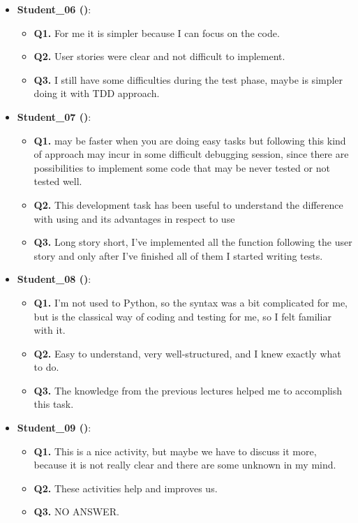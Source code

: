 \begin{itemize}
    \item \textbf{Student\_06 (\notdd)}: 
    \begin{itemize}
        \item \textbf{Q1.} For me it is simpler because I can focus on the code.
        \item \textbf{Q2.} User stories were clear and not difficult to implement.
        \item \textbf{Q3.} I still have some difficulties during the test phase, maybe is simpler doing it with TDD approach.
    \end{itemize}

    \item \textbf{Student\_07 (\notdd)}: 
    \begin{itemize}
        \item \textbf{Q1.} \notdd may be faster when you are doing easy tasks but following this kind of approach may incur in some difficult debugging session, since there are possibilities to implement some code that may be never tested or not tested well.
        \item \textbf{Q2.} This development task has been useful to understand the difference with using \tdd and its advantages in respect to use \notdd
        \item \textbf{Q3.} Long story short, I've implemented all the function following the user story and only after I've finished all of them I started writing tests.
    \end{itemize}

    \item \textbf{Student\_08 (\notdd)}: 
    \begin{itemize}
        \item \textbf{Q1.} I'm not used to Python, so the syntax was a bit complicated for me, but \notdd is the classical way of coding and testing for me, so I felt familiar with it.
        \item \textbf{Q2.} Easy to understand, very well-structured, and I knew exactly what to do.
        \item \textbf{Q3.} The knowledge from the previous lectures helped me to accomplish this task.
    \end{itemize}

    \item \textbf{Student\_09 (\notdd)}: 
    \begin{itemize}
        \item \textbf{Q1.} This is a nice activity, but maybe we have to discuss it more, because it is not really clear and there are some unknown in my mind.
        \item \textbf{Q2.} These activities help and improves us.
        \item \textbf{Q3.} NO ANSWER.
    \end{itemize}
\end{itemize}


